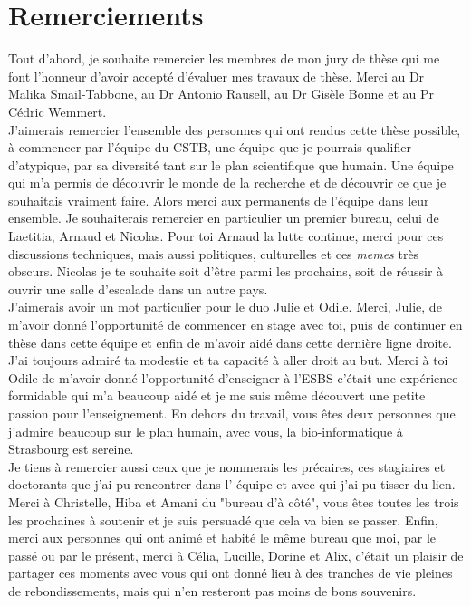 \chapter{Remerciements}
Tout d'abord, je souhaite remercier les membres de mon jury de thèse qui me font l'honneur d'avoir accepté d'évaluer mes travaux de thèse. Merci au Dr Malika Smail-Tabbone, au Dr Antonio Rausell, au Dr Gisèle Bonne et au Pr Cédric Wemmert. \\

J'aimerais remercier l'ensemble des personnes qui ont rendus cette thèse possible, à commencer par l'équipe du CSTB, une équipe que je pourrais qualifier d'atypique, par sa diversité tant sur le plan scientifique que humain. Une équipe qui m'a permis de découvrir le monde de la recherche et de découvrir ce que je souhaitais vraiment faire. Alors merci aux permanents de l'équipe dans leur ensemble. Je souhaiterais remercier en particulier un premier bureau, celui de Laetitia, Arnaud et Nicolas. Pour toi Arnaud la lutte continue, merci pour ces discussions techniques, mais aussi politiques, culturelles et ces \textit{memes} très obscurs. Nicolas je te souhaite soit d'être parmi les prochains, soit de réussir à ouvrir une salle d'escalade dans un autre pays. \\

J'aimerais avoir un mot particulier pour le duo Julie et Odile. Merci, Julie, de m'avoir donné l'opportunité de commencer en stage avec toi, puis de continuer en thèse dans cette équipe et enfin de m'avoir aidé dans cette dernière ligne droite. J'ai toujours admiré ta modestie et ta capacité à aller droit au but. Merci à toi Odile de m'avoir donné l'opportunité d'enseigner à l'ESBS c'était une expérience formidable qui m'a beaucoup aidé et je me suis même découvert une petite passion pour l'enseignement. En dehors du travail, vous êtes deux personnes que j'admire beaucoup sur le plan humain, avec vous, la bio-informatique à Strasbourg est sereine. \\

Je tiens à remercier aussi ceux que je nommerais les précaires, ces stagiaires et doctorants que j'ai pu rencontrer dans l' équipe et avec qui j'ai pu tisser du lien. Merci à Christelle, Hiba et Amani du "bureau d'à côté", vous êtes toutes les trois les prochaines à soutenir et je suis persuadé que cela va bien se passer. Enfin, merci aux personnes qui ont animé et habité le même bureau que moi, par le passé ou par le présent, merci à Célia, Lucille, Dorine et Alix, c'était un plaisir de partager ces moments avec vous qui ont donné lieu à des tranches de vie pleines de rebondissements, mais qui n'en resteront pas moins de bons souvenirs. \\

